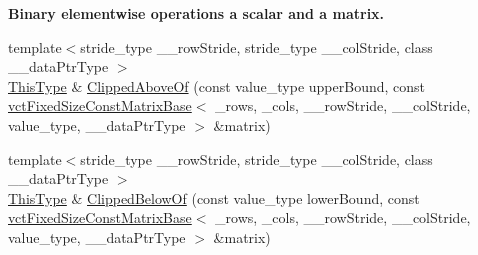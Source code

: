 \begin{Indent}{\bf Binary elementwise operations a scalar and a matrix.}
\begin{DoxyCompactItemize}
\item 
{\footnotesize template$<$stride\+\_\+type \+\_\+\+\_\+row\+Stride, stride\+\_\+type \+\_\+\+\_\+col\+Stride, class \+\_\+\+\_\+data\+Ptr\+Type $>$ }\\\hyperlink{classvct_fixed_size_const_matrix_base_a7ec66a96ed7e08ce9ff54093133c9d8d}{This\+Type} \& \hyperlink{classvct_fixed_size_matrix_base_a810f01578ecafea65c485b5b49fa405a}{Clipped\+Above\+Of} (const value\+\_\+type upper\+Bound, const \hyperlink{classvct_fixed_size_const_matrix_base}{vct\+Fixed\+Size\+Const\+Matrix\+Base}$<$ \+\_\+rows, \+\_\+cols, \+\_\+\+\_\+row\+Stride, \+\_\+\+\_\+col\+Stride, value\+\_\+type, \+\_\+\+\_\+data\+Ptr\+Type $>$ \&matrix)
\item 
{\footnotesize template$<$stride\+\_\+type \+\_\+\+\_\+row\+Stride, stride\+\_\+type \+\_\+\+\_\+col\+Stride, class \+\_\+\+\_\+data\+Ptr\+Type $>$ }\\\hyperlink{classvct_fixed_size_const_matrix_base_a7ec66a96ed7e08ce9ff54093133c9d8d}{This\+Type} \& \hyperlink{classvct_fixed_size_matrix_base_a442058297b9cf2e7da23efeafbcd3e45}{Clipped\+Below\+Of} (const value\+\_\+type lower\+Bound, const \hyperlink{classvct_fixed_size_const_matrix_base}{vct\+Fixed\+Size\+Const\+Matrix\+Base}$<$ \+\_\+rows, \+\_\+cols, \+\_\+\+\_\+row\+Stride, \+\_\+\+\_\+col\+Stride, value\+\_\+type, \+\_\+\+\_\+data\+Ptr\+Type $>$ \&matrix)
\end{DoxyCompactItemize}
\end{Indent}
